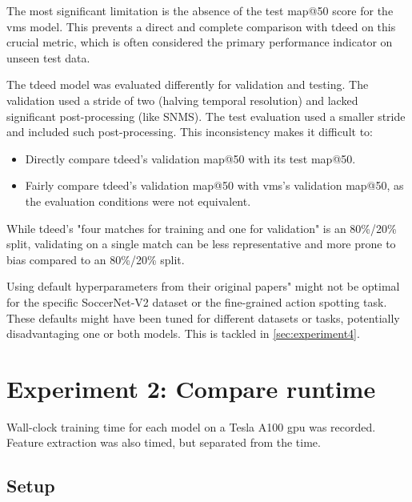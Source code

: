 The most significant limitation is the absence of the test \acrshort{map}@50 score for the \acrshort{vms} model. This prevents a direct and complete comparison with \acrshort{tdeed} on this crucial metric, which is often considered the primary performance indicator on unseen test data.

The \acrshort{tdeed} model was evaluated differently for validation and testing. The validation used a stride of two (halving temporal resolution) and lacked significant post-processing (like SNMS). The test evaluation used a smaller stride and included such post-processing. This inconsistency makes it difficult to:

\begin{itemize}
    \item Directly compare \acrshort{tdeed}'s validation \acrshort{map}@50 with its test \acrshort{map}@50.
    \item Fairly compare \acrshort{tdeed}'s validation \acrshort{map}@50 with \acrshort{vms}'s validation \acrshort{map}@50, as the evaluation conditions were not equivalent.
\end{itemize}

While \acrshort{tdeed}'s "four matches for training and one for validation" is an 80\%/20\% split, validating on a single match can be less representative and more prone to bias compared to an 80\%/20\% split.

Using default hyperparameters from their original papers" might not be optimal for the specific SoccerNet-V2 dataset or the fine-grained action spotting task. These defaults might have been tuned for different datasets or tasks, potentially disadvantaging one or both models. This is tackled in \autoref{sec:experiment4}.



\section{Experiment 2: Compare runtime}
\label{sec:experiment2}

Wall-clock training time for each model on a Tesla A100 \acrshort{gpu} was recorded. Feature extraction was also timed, but separated from the time. 


\subsection{Setup}
\label{ssec:ex2_setup}

